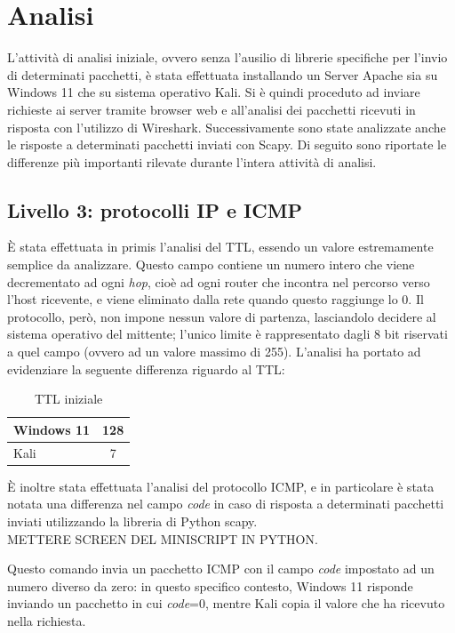 \chapter{Analisi}
L'attività di analisi iniziale, ovvero senza l'ausilio di librerie specifiche per l'invio di determinati pacchetti, è stata effettuata installando un Server Apache sia su Windows 11 che su sistema operativo Kali.
Si è quindi proceduto ad inviare richieste ai server tramite browser web e all'analisi dei pacchetti ricevuti in risposta con l'utilizzo di Wireshark.
Successivamente sono state analizzate anche le risposte a determinati pacchetti inviati con Scapy.
Di seguito sono riportate le differenze più importanti rilevate durante l'intera attività di analisi.

\section{Livello 3: protocolli IP e ICMP}
È stata effettuata in primis l'analisi del TTL, essendo un valore estremamente semplice da analizzare.
Questo campo contiene un numero intero che viene decrementato ad ogni \textit{hop}, cioè ad ogni router che incontra nel percorso verso l'host ricevente, e viene eliminato dalla rete quando questo raggiunge lo 0.
Il protocollo, però, non impone nessun valore di partenza, lasciandolo decidere al sistema operativo del mittente; l'unico limite è rappresentato dagli 8 bit riservati a quel campo (ovvero ad un valore massimo di 255).
L'analisi ha portato ad evidenziare la seguente differenza riguardo al TTL:
\begin{table}[H]
	\centering
	\begin{tabular}{ l | c }
		\hline
		\rowcolor{blue!10} Windows 11 & 128
		\\
		\hline
		\rowcolor{red!10} Kali & 7
		\\
		\hline
		
	\end{tabular}
	\caption{TTL iniziale}
	\label{tab:TTL}
\end{table}

È inoltre stata effettuata l'analisi del protocollo ICMP, e in particolare è stata notata una differenza nel campo \textit{code} in caso di risposta a determinati pacchetti inviati utilizzando la libreria di Python scapy.
\\

METTERE SCREEN DEL MINISCRIPT IN PYTHON.

Questo comando invia un pacchetto ICMP con il campo \textit{code} impostato ad un numero diverso da zero: in questo specifico contesto, Windows 11 risponde inviando un pacchetto in cui \textit{code}=0, mentre Kali copia il valore che ha ricevuto nella richiesta.

